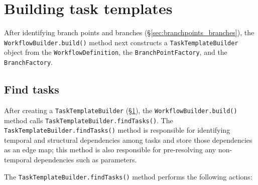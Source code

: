\documentclass{report}
\begin{document}
%
%
%
%


\section{Building task templates}
\label{sec:buildTaskTemplates}

After identifying branch points and branches (\S\ref{sec:branchpoints_branches}), the \texttt{WorkflowBuilder.build()} method next constructs a \texttt{TaskTemplateBuilder} object from the \texttt{WorkflowDefinition}, the \texttt{BranchPointFactory}, and the \texttt{BranchFactory}.
%


\subsection{Find tasks}

After creating a \texttt{TaskTemplateBuilder} (\S\ref{sec:buildTaskTemplates}), the \texttt{WorkflowBuilder.build()} method calls \texttt{TaskTemplateBuilder.findTasks()}.
%
The \texttt{TaskTemplateBuilder.findTasks()} method is responsible for identifying temporal and structural dependencies among tasks and store those dependencies as an edge map; this method is also responsible for pre-resolving any non-temporal dependencies such as parameters.


The \texttt{TaskTemplateBuilder.findTasks()} method performs the following actions:
\end{document}
